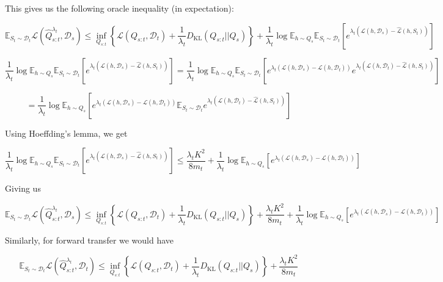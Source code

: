 \documentclass[letterpaper]{article}
\theoremstyle{definition}
\begin{document}
This gives us the following oracle inequality (in expectation):

$$\mathbb{E}_{S_t\sim \mathcal{D}_t}\mathcal{L}( \hat{Q}^{\lambda_t}_{s:t},\mathcal{D}_s)\leq \inf_{Q_{s:t}}\left \{ \mathcal{L}(Q_{s:t},\mathcal{D}_t) + \frac{1}{\lambda_t}D_{\mathrm{KL}}(Q_{s:t}||Q_{s}) \right \}+\frac{1}{\lambda_t}\log\mathbb{E}_{h\sim Q_s}\mathbb{E}_{S_t\sim \mathcal{D}_t}\left [e^{\lambda_t(\mathcal{L}(h,\mathcal{D}_s)-\hat{\mathcal{L}}(h,S_t))} \right ]$$

$$\frac{1}{\lambda_t}\log\mathbb{E}_{h\sim Q_s}\mathbb{E}_{S_t\sim \mathcal{D}_t}\left [e^{\lambda_t(\mathcal{L}(h,\mathcal{D}_s)-\hat{\mathcal{L}}(h,S_t))} \right ]=\frac{1}{\lambda_t}\log\mathbb{E}_{h\sim Q_s}\mathbb{E}_{S_t\sim \mathcal{D}_t}\left [e^{\lambda_t(\mathcal{L}(h,\mathcal{D}_s)-\mathcal{L}(h,\mathcal{D}_t))}e^{\lambda_t(\mathcal{L}(h,\mathcal{D}_t)-\hat{\mathcal{L}}(h,S_t))} \right ]$$

$$=\frac{1}{\lambda_t}\log\mathbb{E}_{h\sim Q_s}\left [e^{\lambda_t(\mathcal{L}(h,\mathcal{D}_s)-\mathcal{L}(h,\mathcal{D}_t))}\mathbb{E}_{S_t\sim \mathcal{D}_t}e^{\lambda_t(\mathcal{L}(h,\mathcal{D}_t)-\hat{\mathcal{L}}(h,S_t))} \right ]$$

Using Hoeffding's lemma, we get

$$\frac{1}{\lambda_t}\log\mathbb{E}_{h\sim Q_s}\mathbb{E}_{S_t\sim \mathcal{D}_t}\left [e^{\lambda_t(\mathcal{L}(h,\mathcal{D}_s)-\hat{\mathcal{L}}(h,S_t))} \right ] \leq \frac{\lambda_t K^2}{8m_t}+\frac{1}{\lambda_t}\log\mathbb{E}_{h\sim Q_s}\left [e^{\lambda_t(\mathcal{L}(h,\mathcal{D}_s)-\mathcal{L}(h,\mathcal{D}_t))} \right ]$$

Giving us

\begin{equation} \label{eq:oracle-base}
\mathbb{E}_{S_t\sim \mathcal{D}_t}\mathcal{L}( \hat{Q}^{\lambda_t}_{s:t},\mathcal{D}_s)\leq \inf_{Q_{s:t}}\left \{ \mathcal{L}(Q_{s:t},\mathcal{D}_t) + \frac{1}{\lambda_t}D_{\mathrm{KL}}(Q_{s:t}||Q_{s}) \right \}+\frac{\lambda_t K^2}{8m_t}+\frac{1}{\lambda_t}\log\mathbb{E}_{h\sim Q_s}\left [e^{\lambda_t(\mathcal{L}(h,\mathcal{D}_s)-\mathcal{L}(h,\mathcal{D}_t))} \right ]
\end{equation}

Similarly, for forward transfer we would have

\begin{equation}
\mathbb{E}_{S_t\sim \mathcal{D}_t}\mathcal{L}(\hat{Q}^{\lambda_t}_{s:t},\mathcal{D}_t)\leq \inf_{Q_{s:t}}\left \{ \mathcal{L}(Q_{s:t},\mathcal{D}_t) + \frac{1}{\lambda_t}D_{\mathrm{KL}}(Q_{s:t}||Q_{s}) \right \}+\frac{\lambda_t K^2}{8m_t}
\end{equation}
\end{document}
